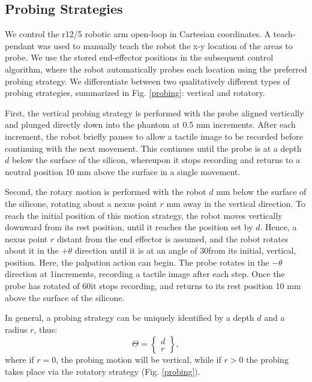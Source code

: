 \subsection{Probing Strategies} \label{sec_motor_interactions}

We control the r12/5 robotic arm open-loop in Cartesian coordinates. A teach-pendant was used to manually teach the 
robot the x-y location of the areas to probe. We use the stored end-effector positions in the subsequent 
control algorithm, where the robot automatically probes each location using the preferred probing strategy. 
We differentiate between two qualitatively different types of probing strategies, summarized in 
Fig. \ref{probing}: vertical and rotatory. 

First, the vertical probing strategy is performed with the probe aligned vertically and plunged 
directly down into the phantom at 0.5 mm increments. After each increment, the robot briefly pauses to allow a 
tactile image to be recorded before continuing with the next movement. This continues until the probe is at a 
depth $d$ below the surface of the silicon, whereupon it stops recording and returns to a neutral position 10 mm 
above the surface in a single movement.

Second, the rotary motion is performed with the robot $d$ mm below the surface of the silicone, rotating about 
a nexus point $r$ mm away in the vertical direction. To reach the initial position of this motion strategy, 
the robot moves vertically downward from its rest position, until it reaches the position set by $d$. Hence, a 
nexus point $r$ distant from the end effector is assumed, and the robot rotates about it in the $+\theta$ 
direction until it is at an angle of 30\degree from its initial, vertical, position. Here, the palpation action can 
begin. The probe rotates in the $-\theta$ direction at 1\degree increments, recording a tactile image after each step. 
Once the probe has rotated of 60\degree it stops recording, and returns to its rest position 10 mm above the 
surface of the silicone. 

In general, a probing strategy can be uniquely identified by a depth $d$ and a radius $r$, thus:
\begin{equation}
\Theta = \begin{Bmatrix}d\\ r\end{Bmatrix},
\end{equation} 
where if $r=0$, the probing motion will be vertical, while if $r>0$ the probing takes place via the 
rotatory strategy (Fig. \ref{probing}).




